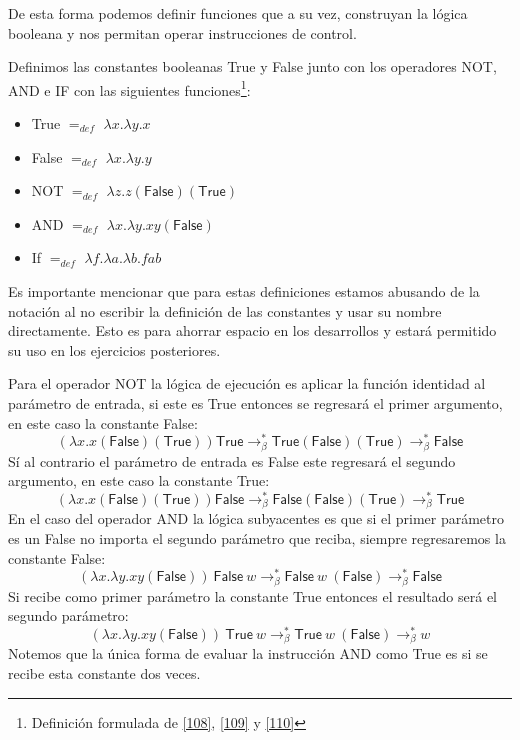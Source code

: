     De esta forma podemos definir funciones que a su vez, construyan la lógica booleana y nos permitan operar instrucciones de control.
    \begin{definition} Definimos las constantes booleanas \textsf{True} y \textsf{False} junto con los operadores \textsf{NOT}, \textsf{AND} e \textsf{IF} con las siguientes funciones\footnote{Definición formulada de \hyperlink{108}{[108]},  \hyperlink{109}{[109]} y  \hyperlink{110}{[110]}}:\\

        \begin{itemize}
            \item \textsf{True}  $=_{def}$  $\lambda x.\lambda y.x$ 
            \item \textsf{False}  $=_{def}$   $\lambda x.\lambda y.y$ 
            \item\textsf{NOT}   $=_{def}$   $\lambda z. z  (\textsf{False}) (\textsf{True})$ 
            \item \textsf{AND}  $=_{def}$  $\lambda x.\lambda y. xy (\textsf{False})$ 
	     \item \textsf{If}      $=_{def}$ $\lambda f.\lambda a.\lambda b.fab $
        \end{itemize}
	  \bigskip
	Es importante mencionar que para estas definiciones estamos abusando de la notación al no escribir la definición de las constantes y usar su nombre directamente. Esto es para ahorrar espacio en los desarrollos y estará permitido su uso en los ejercicios posteriores.
    \end{definition}

    Para el operador \textsf{NOT} la lógica de ejecución es aplicar la función identidad al parámetro de entrada, si este es \textsf{True} entonces se regresará el primer argumento, en este caso la constante \textsf{False}: \[ (\lambda x.x (\textsf{False})(\textsf{True}))\textsf{True} \to_\beta^* \textsf{True}(\textsf{False})(\textsf{True}) \to_\beta^* \textsf{False}\] 
	Sí al contrario el parámetro de entrada es \textsf{False} este regresará el segundo argumento, en este caso la constante \textsf{True}: \[ (\lambda x.x (\textsf{False})(\textsf{True}))\textsf{False} \to_\beta^* \textsf{False}(\textsf{False})(\textsf{True}) \to_\beta^* \textsf{True}\]
    En el caso del operador \textsf{AND} la lógica subyacentes es que si el primer parámetro es un \textsf{False} no importa el segundo parámetro que reciba, siempre regresaremos la constante \textsf{False}:
\[ (\lambda x.\lambda y. xy (\textsf{False}))\ \textsf{False}\  w \to_\beta^* \textsf{False}\ w\ (\textsf{False}) \to_\beta^* \textsf{False}  \]
Si recibe como primer parámetro la constante \textsf{True} entonces el resultado será el segundo parámetro:
\[ (\lambda x.\lambda y. xy (\textsf{False}))\ \textsf{True}\  w \to_\beta^* \textsf{True}\ w\ (\textsf{False}) \to_\beta^* w  \]
Notemos que la única forma de evaluar la instrucción \textsf{AND} como \textsf{True} es si se recibe esta constante dos veces.

